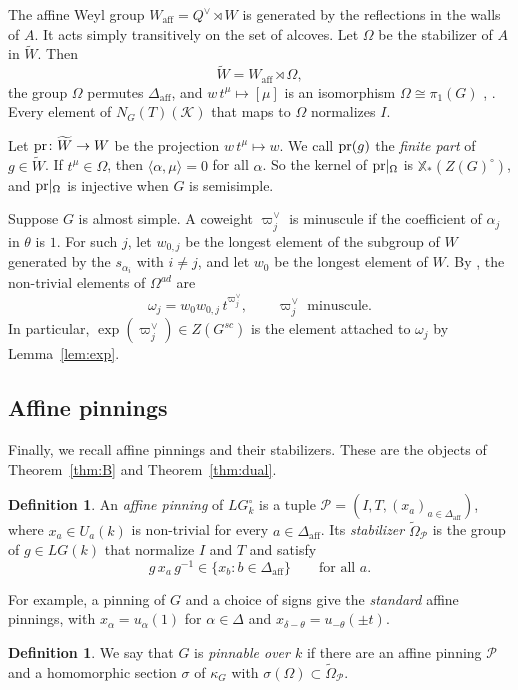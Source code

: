 \documentclass[psamsfonts]{amsart}
\theoremstyle{definition}
\newtheorem{defn}[thm]{Definition}
\theoremstyle{remark}
\numberwithin{equation}{section}
\newcommand{\X}{\mathbb{X}}
\newcommand{\extw}{\widetilde{W}}
\newcommand{\ra}{\rightarrow}
\newcommand{\tOm}{\widetilde{\Omega}}
\DeclareMathOperator{\aff}{aff}
\newcommand\cK{\mathcal{K}}
\newcommand\cP{\mathcal{P}}
\numberwithin{equation}{section}
\newcommand{\om}{\omega}
\newcommand{\Om}{\Omega}
\newcommand\Wa{W_{\aff}}
\newcommand\pr{\textup{pr}}
\newcommand{\Daff}{\Delta_{\aff}}
\theoremstyle{plain}
\begin{document}
The affine Weyl group $\Wa=Q^\vee\rtimes W$ is generated by the reflections in the walls of $A$. It acts simply transitively on the set of alcoves. Let $\Om$ be the stabilizer of $A$ in $\extw$. Then
\[
\extw=\Wa\rtimes\Om,
\]
the group $\Om$ permutes $\Daff$, and $w\,t^{\mu}\mapsto[\mu]$ is an isomorphism $\Om\cong\pi_1(G)$ \cite{IM65}, \cite[Lemma~14]{HR08}. Every element of $N_G(T)(\cK)$ that maps to $\Om$ normalizes $I$.

Let $\pr\colon\extw\ra W$ be the projection $w\,t^{\mu}\mapsto w$. We call $\pr(g)$ the \emph{finite part} of $g\in\extw$. If $t^{\mu}\in\Om$, then $\langle\alpha,\mu\rangle=0$ for all $\alpha$. So the kernel of $\pr|_{\Om}$ is $\X_*(Z(G)^{\circ})$, and $\pr|_{\Om}$ is injective when $G$ is semisimple.

Suppose $G$ is almost simple. A coweight $\varpi_j^\vee$ is minuscule if the coefficient of $\alpha_j$ in $\theta$ is $1$. For such $j$, let $w_{0,j}$ be the longest element of the subgroup of $W$ generated by the $s_{\alpha_i}$ with $i\neq j$, and let $w_0$ be the longest element of $W$. By \cite[Proposition~1.18]{IM65}, the non-trivial elements of $\Om^{ad}$ are
\[
\om_j=w_0w_{0,j}\,t^{\varpi_j^\vee},\qquad \varpi_j^\vee\text{ minuscule}.
\]
In particular, $\exp(\varpi_j^\vee)\in Z(G^{sc})$ is the element attached to $\om_j$ by Lemma~\ref{lem:exp}.

\subsection{Affine pinnings}\label{subsec:affine-pinning}
Finally, we recall affine pinnings and their stabilizers. These are the objects of Theorem~\ref{thm:B} and Theorem~\ref{thm:dual}.

\begin{defn}\label{defn:affine-pinning}
An \emph{affine pinning} of $LG_k^{\circ}$ is a tuple $\cP=(I,T,(x_a)_{a\in\Daff})$, where $x_a\in U_a(k)$ is non-trivial for every $a\in\Daff$. Its \emph{stabilizer} $\tOm_{\cP}$ is the group of $g\in LG(k)$ that normalize $I$ and $T$ and satisfy
\[
g\,x_a\,g^{-1}\in\{x_b:b\in\Daff\}\qquad\text{for all }a.
\]
\end{defn}

For example, a pinning of $G$ and a choice of signs give the \emph{standard} affine pinnings, with $x_\alpha=u_\alpha(1)$ for $\alpha\in\Delta$ and $x_{\delta-\theta}=u_{-\theta}(\pm t)$.

\begin{defn}\label{defn:pinnable}
We say that $G$ is \emph{pinnable over $k$} if there are an affine pinning $\cP$ and a homomorphic section $\sigma$ of $\kappa_G$ with $\sigma(\Om)\subset\tOm_{\cP}$.
\end{defn}
\end{document}

